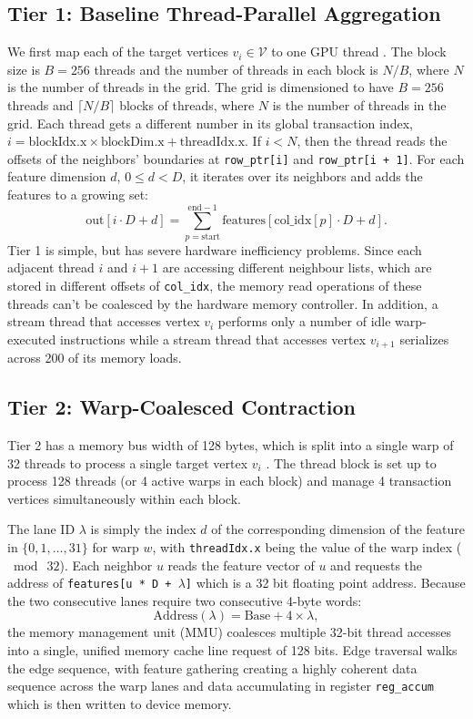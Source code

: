 \documentclass[journal]{IEEEtran}
\begin{document}
\subsection{Tier 1: Baseline Thread-Parallel Aggregation}
We first map each of the target vertices $v_i \in \mathcal{V}$ to one GPU thread \cite{nvidia2023cuda}. The block size is $B = 256$ threads and the number of threads in each block is $N/B$, where $N$ is the number of threads in the grid. The grid is dimensioned to have $B = 256$ threads and $\lceil N/B \rceil$ blocks of threads, where $N$ is the number of threads in the grid. Each thread gets a different number in its global transaction index, $i = \text{blockIdx.x} \times \text{blockDim.x} + \text{threadIdx.x}$. If $i < N$, then the thread reads the offsets of the neighbors' boundaries at \texttt{row\_ptr[i]} and \texttt{row\_ptr[i + 1]}. For each feature dimension $d$, $0 \le d < D$, it iterates over its neighbors and adds the features to a growing set:
\begin{equation}
    \text{out}[i \cdot D + d] = \sum_{p=\text{start}}^{\text{end}-1} \text{features}[\text{col\_idx}[p] \cdot D + d].
    \label{eq:tier1}
\end{equation}
Tier 1 is simple, but has severe hardware inefficiency problems. Since each adjacent thread $i$ and $i + 1$ are accessing different neighbour lists, which are stored in different offsets of \texttt{col\_idx}, the memory read operations of these threads can't be coalesced by the hardware memory controller. In addition, a stream thread that accesses vertex $v_i$ performs only a number of idle warp-executed instructions while a stream thread that accesses vertex $v_{i+1}$ serializes across 200 of its memory loads.

\subsection{Tier 2: Warp-Coalesced Contraction}
Tier 2 has a memory bus width of 128 bytes, which is split into a single warp of 32 threads to process a single target vertex $v_i$ \cite{yang2018design, volkov2010better}. The thread block is set up to process 128 threads (or 4 active warps in each block) and manage 4 transaction vertices simultaneously within each block.

The lane ID $\lambda$ is simply the index $d$ of the corresponding dimension of the feature in $\{0, 1, \dots, 31\}$ for warp $w$, with \texttt{threadIdx.x} being the value of the warp index ($\bmod~32$). Each neighbor $u$ reads the feature vector of $u$ and requests the address of \texttt{features[u * D + $\lambda$]} which is a 32 bit floating point address. Because the two consecutive lanes require two consecutive 4-byte words:
\begin{equation}
    \text{Address}(\lambda) = \text{Base} + 4 \times \lambda,
    \label{eq:coalescing}
\end{equation}
the memory management unit (MMU) coalesces multiple 32-bit thread accesses into a single, unified memory cache line request of 128 bits. Edge traversal walks the edge sequence, with feature gathering creating a highly coherent data sequence across the warp lanes and data accumulating in register \texttt{reg\_accum} which is then written to device memory.
\end{document}
